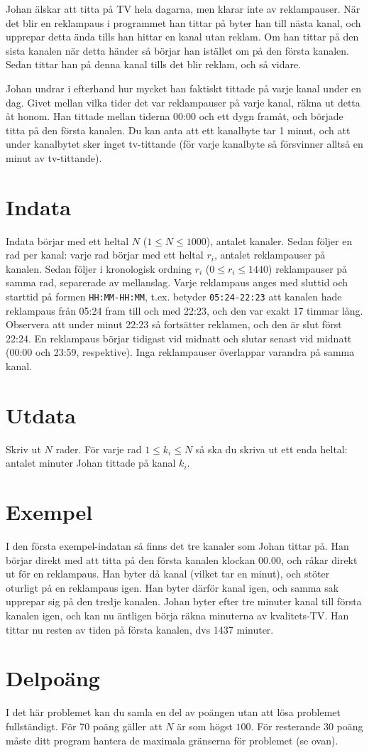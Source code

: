 
Johan älskar att titta på TV hela dagarna, men klarar inte av reklampauser. När det blir en reklampaus i programmet han tittar på byter han till nästa kanal, och upprepar detta ända tills han hittar en kanal utan reklam. Om han tittar på den sista kanalen när detta händer så börjar han istället om på den första kanalen. Sedan tittar han på denna kanal tills det blir reklam, och så vidare.

Johan undrar i efterhand hur mycket han faktiskt tittade på varje kanal under en dag. Givet mellan vilka tider det var reklampauser på varje kanal, räkna ut detta åt honom. Han tittade mellan tiderna 00:00 och ett dygn framåt, och började titta på den första kanalen. Du kan anta att ett kanalbyte tar 1 minut, och att under kanalbytet sker inget tv-tittande (för varje kanalbyte så försvinner alltså en minut av tv-tittande).

\section*{Indata}
Indata börjar med ett heltal $N$ ($1 \leq N \leq 1000$), antalet kanaler. Sedan följer en rad per kanal: varje rad börjar med ett heltal $r_i$, antalet reklampauser på kanalen. Sedan följer i kronologisk ordning $r_i$ ($0 \leq r_i \leq 1440$) reklampauser på samma rad, separerade av mellanslag. Varje reklampaus anges med sluttid och starttid på formen \texttt{HH:MM-HH:MM}, t.ex. betyder \texttt{05:24-22:23} att kanalen hade reklampaus från 05:24 fram till och med 22:23, och den var exakt 17 timmar lång. Observera att under minut 22:23 så fortsätter reklamen, och den är slut först 22:24. En reklampaus börjar tidigast vid midnatt och slutar senast vid midnatt (00:00 och 23:59, respektive). Inga reklampauser överlappar varandra på samma kanal.

\section*{Utdata}
Skriv ut $N$ rader. För varje rad $1 \leq k_i \leq N$ så ska du skriva ut ett enda heltal: antalet minuter Johan tittade på kanal $k_i$.

\section*{Exempel}
I den första exempel-indatan så finns det tre kanaler som Johan tittar på. Han börjar direkt med att titta på den första kanalen klockan 00.00, och råkar direkt ut för en reklampaus. Han byter då kanal (vilket tar en minut), och stöter oturligt på en reklampaus igen. Han byter därför kanal igen, och samma sak upprepar sig på den tredje kanalen. Johan byter efter tre minuter kanal till första kanalen igen, och kan nu äntligen börja räkna minuterna av kvalitets-TV. Han tittar nu resten av tiden på första kanalen, dvs 1437 minuter.

\section*{Delpoäng}
I det här problemet kan du samla en del av poängen utan att lösa problemet fullständigt. För 70 poäng gäller att $N$ är som högst $100$. För resterande 30 poäng måste ditt program hantera de maximala gränserna för problemet (se ovan).
